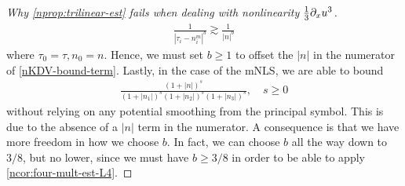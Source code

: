 \begin{proof}[Why \cref{nprop:trilinear-est} fails when dealing
with nonlinearity $\frac{1}{3} \partial_x u^3$]
\begin{equation*}
\begin{split}
		\frac{1}{| \tau_{i} - n_{i}^{m} |^{b}} \gtrsim \frac{1}{|n|^{b}}	
	\end{split}
\end{equation*}
%
%
where $\tau_0 =\tau, n_0 = n$. 
Hence, we must set $b \ge 1$ to offset the $|n|$ in the numerator of 
\eqref{nKDV-bound-term}.
Lastly, in the case of the mNLS, we are able to bound 
\begin{equation*}
	\begin{split}
    \frac{\left (1 + |n| \right ) ^s}{\left (1 + |n_1| \right ) ^s \left (1 +
    |n_2| \right ) ^s \left (1 + |n_3| \right ) ^s}, \quad s \ge 0 
	\end{split}
\end{equation*}
without relying on any potential smoothing from the principal symbol.
This is due to the
absence of a $|n|$ term in the
numerator. A consequence is that we have more freedom in how
we choose $b$. In fact, we can choose $b$ all the way down to $3/8$, but no
lower, since we must have $b \ge 3/8$ in order to be able to apply
\cref{ncor:four-mult-est-L4}. 
\end{proof}
%
%

